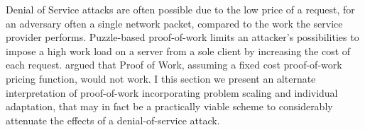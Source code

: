 %
%

Denial of Service attacks are often possible due to the low price of a request, for an adversary often a single network packet\cite{gunter}, compared to the work the service provider performs. Puzzle-based proof-of-work limits an attacker's possibilities to impose a high work load on a server from a sole client by increasing the cost of each request.   argued that Proof of Work, assuming a fixed cost proof-of-work pricing function, would not work. I this section we present an alternate interpretation of proof-of-work incorporating problem scaling and individual adaptation, that may in fact be a practically viable scheme to considerably attenuate the effects of a denial-of-service attack.

